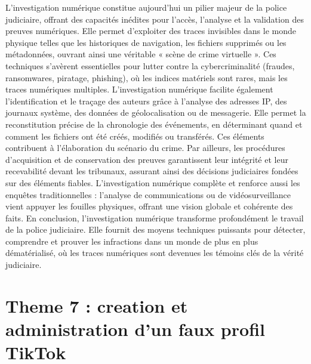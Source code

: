 \documentclass[12pt]{article}
\begin{document}
L’investigation numérique constitue aujourd’hui un pilier majeur de la police judiciaire, offrant des capacités inédites pour l’accès, l’analyse et la validation des preuves numériques. Elle permet d’exploiter des traces invisibles dans le monde physique telles que les historiques de navigation, les fichiers supprimés ou les métadonnées, ouvrant ainsi une véritable « scène de crime virtuelle ». Ces techniques s’avèrent essentielles pour lutter contre la cybercriminalité (fraudes, ransomwares, piratage, phishing), où les indices matériels sont rares, mais les traces numériques multiples.
L’investigation numérique facilite également l’identification et le traçage des auteurs grâce à l’analyse des adresses IP, des journaux système, des données de géolocalisation ou de messagerie. Elle permet la reconstitution précise de la chronologie des événements, en déterminant quand et comment les fichiers ont été créés, modifiés ou transférés. Ces éléments contribuent à l’élaboration du scénario du crime. Par ailleurs, les procédures d’acquisition et de conservation des preuves garantissent leur intégrité et leur recevabilité devant les tribunaux, assurant ainsi des décisions judiciaires fondées sur des éléments fiables. L’investigation numérique complète et renforce aussi les enquêtes traditionnelles : l’analyse de communications ou de vidéosurveillance vient appuyer les fouilles physiques, offrant une vision globale et cohérente des faits. En conclusion, l’investigation numérique transforme profondément le travail de la police judiciaire. Elle fournit des moyens techniques puissants pour détecter, comprendre et prouver les infractions dans un monde de plus en plus dématérialisé, où les traces numériques sont devenues les témoins clés de la vérité judiciaire.

\section{Theme 7 : creation et administration d'un faux profil TikTok}
\end{document}
